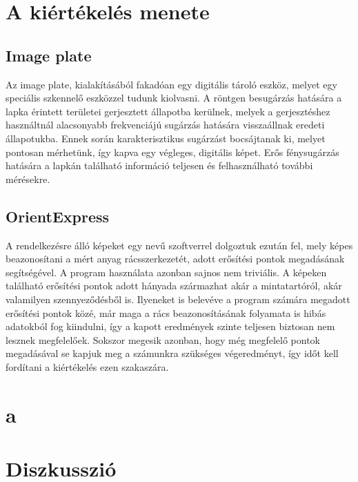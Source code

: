 \begin{multicols}{2}
\section{A kiértékelés menete}
\subsection{Image plate}
Az image plate, kialakításából fakadóan egy digitális tároló eszköz, melyet egy speciális szkennelő eszközzel tudunk kiolvasni. A röntgen besugárzás hatására a lapka érintett területei gerjesztett állapotba kerülnek, melyek a gerjesztéshez használtnál alacsonyabb frekvenciájú sugárzás hatására visszaállnak eredeti állapotukba. Ennek során karakterisztikus sugárzást bocsájtanak ki, melyet pontosan mérhetünk, így kapva egy végleges, digitális képet. Erős fénysugárzás hatására a lapkán található információ teljesen  és felhasználható további mérésekre.

\subsection{OrientExpress}
A rendelkezésre álló képeket egy  nevű szoftverrel dolgoztuk ezután fel, mely képes beazonosítani a mért anyag rácsszerkezetét, adott erősítési pontok megadásának segítségével. A program használata azonban sajnos nem triviális. A képeken található erősítési pontok adott hányada származhat akár a mintatartóról, akár valamilyen szennyeződésből is. Ilyeneket is belevéve a program számára megadott erősítési pontok közé, már maga a rács beazonosításának folyamata is hibás adatokból fog kiindulni, így a kapott eredmények szinte teljesen biztosan nem lesznek megfelelőek. Sokszor megesik azonban, hogy még megfelelő pontok megadásával se kapjuk meg a számunkra szükséges végeredményt, így időt kell fordítani a kiértékelés ezen szakaszára.

\section{a}


\section{Diszkusszió}


\end{multicols}